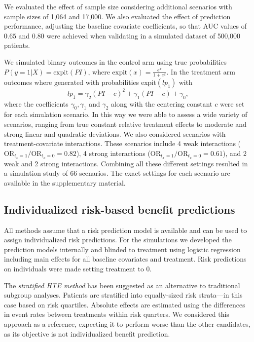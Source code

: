 \documentclass{article}
\begin{document}
We evaluated the effect of sample size considering additional scenarios
with sample sizes of 1,064 and 17,000. We also evaluated the effect of
prediction performance, adjusting the baseline covariate coefficients,
so that AUC values of \(0.65\) and \(0.80\) were achieved when
validating in a simulated dataset of 500,000 patients.

We simulated binary outcomes in the control arm using true probabilities
\(P(y=1|X) = \text{expit}(PI)\), where
\(\text{expit}(x)= \frac{e^x}{1 + e^x}\). In the treatment arm outcomes
where generated with probabilities \(\text{expit}(lp_1)\) with
\[ lp_1 = \gamma_2(PI-c)^2 + \gamma_1(PI-c) + \gamma_0,\] where the
coefficients \(\gamma_0, \gamma_1\) and \(\gamma_2\) along with the
centering constant \(c\) were set for each simulation scenario. In this
way we were able to assess a wide variety of scenarios, ranging from
true constant relative treatment effects to moderate and strong linear
and quadratic deviations. We also considered scenarios with
treatment-covariate interactions. These scenarios include 4 weak
interactions (\(\text{OR}_{t_x=1} / \text{OR}_{t_x=0}=0.82\)), 4 strong
interactions (\(\text{OR}_{t_x=1} / \text{OR}_{t_x=0}=0.61\)), and 2
weak and 2 strong interactions. Combining all these different settings
resulted in a simulation study of \(66\) scenarios. The exact settings
for each scenario are available in the supplementary material.

\hypertarget{individualized-risk-based-benefit-predictions}{%
\subsection{Individualized risk-based benefit
predictions}\label{individualized-risk-based-benefit-predictions}}

All methods assume that a risk prediction model is available and can be
used to assign individualized risk predictions. For the simulations we
developed the prediction models internally and blinded to treatment
using logistic regression including main effects for all baseline
covariates and treatment. Risk predictions on individuals were made
setting treatment to \(0\).

The \emph{stratified HTE method} has been suggested as an alternative to
traditional subgroup analyses. Patients are stratified into
equally-sized risk strata---in this case based on risk quartiles.
Absolute effects are estimated using the differences in event rates
between treatments within risk quarters. We considered this approach as
a reference, expecting it to perform worse than the other candidates, as
its objective is not individualized benefit prediction.
\end{document}
